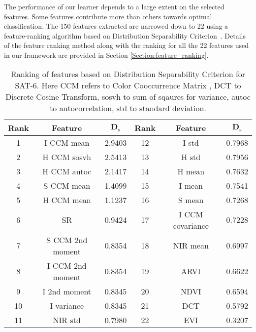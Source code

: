 \documentclass[]{interact}
\theoremstyle{plain}\newtheorem{theorem}{Theorem}[section]
\theoremstyle{definition}
\theoremstyle{remark}
\begin{document}
The performance of our learner depends to a large extent on the selected features. Some features contribute more than others towards optimal classification. The 150 features extracted are narrowed down to 22 using a feature-ranking algorithm based on Distribution Separability Criterion~\citep{Boureau10atheoretical}. Details of the feature ranking method along with the ranking for all the 22 features used in our framework are provided in Section \ref{Section:feature_ranking}. 


\begin{table}[b]
\begin{center}
\footnotesize
\begin{tabular}{cccccc}
\hline
 \textbf{Rank} & \textbf{Feature} & \multicolumn{1}{c|}{$\boldsymbol{D_{\mathrm s}}$} & \textbf{Rank} & \textbf{Feature}        & $\boldsymbol{D_{\mathrm s}}$       \\ \hline
1&I CCM mean         & \multicolumn{1}{c|}{2.9403}              & 12   &   I std    &   0.7968    \\
2 & H CCM sosvh       & \multicolumn{1}{c|}{2.5413}             & 13   &   H std    &    0.7956  \\
3 & H CCM autoc     & \multicolumn{1}{c|}{2.1417}               & 14   &   H mean   &   0.7632  \\
4 & S CCM mean       & \multicolumn{1}{c|}{1.4099}              & 15   &   I mean   &    0.7541  \\
5 &  H CCM mean         & \multicolumn{1}{c|}{1.1237}           & 16   &   S mean   &     0.7268 \\
6 &   SR          & \multicolumn{1}{c|}{0.9424}                 & 17   &   I CCM covariance & 0.7228 \\
7 &   S CCM 2nd moment         & \multicolumn{1}{c|}{0.8354}    & 18   &   NIR mean &    0.6997\\
8 &   I CCM 2nd moment         & \multicolumn{1}{c|}{0.8354}    & 19   &   ARVI     &     0.6622 \\
9  &   I 2nd moment    & \multicolumn{1}{c|}{0.8345}            & 20   &   NDVI     &     0.6594\\
10   &  I variance         & \multicolumn{1}{c|}{0.8345}        & 21   &    DCT     &    0.5792 \\
11   &   NIR std         & \multicolumn{1}{c|}{0.7980}          & 22   &    EVI     &    0.3207 \\ 
\hline 
\end{tabular}
\end{center}
\caption{Ranking of features based on Distribution Separability Criterion for SAT-6. Here CCM refers to Color Cooccurrence Matrix \citep{boyda2017deploying}, DCT to Discrete Cosine Transform, sosvh to sum of sqaures for variance, autoc to autocorrelation, std to standard deviation.}
\label{table:Feature_ranking}
\end{table}
\end{document}
